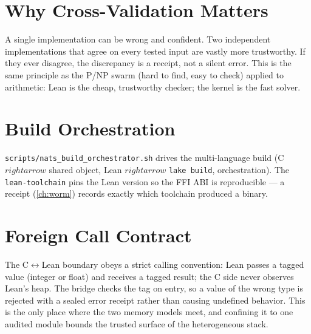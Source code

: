 \section{Why Cross-Validation Matters}
\label{sec:ffi-why}

A single implementation can be wrong and confident. Two independent
implementations that agree on every tested input are vastly more trustworthy.
If they ever disagree, the discrepancy is a receipt, not a silent error. This
is the same principle as the P/NP swarm (hard to find, easy to check)
applied to arithmetic: Lean is the cheap, trustworthy checker; the kernel is
the fast solver.

\section{Build Orchestration}
\label{sec:ffi-build}

\texttt{scripts/nats\_build\_orchestrator.sh} drives the multi-language build
(C $\ensuremath{rightarrow}$ shared object, Lean $\ensuremath{rightarrow}$ \texttt{lake build},
orchestration). The \texttt{lean-toolchain} pins the Lean version so the FFI
ABI is reproducible --- a receipt (\cref{ch:worm}) records exactly which
toolchain produced a binary.

\section{Foreign Call Contract}
\label{sec:ffi-contract}

The C$\leftrightarrow$Lean boundary obeys a strict calling convention:
Lean passes a tagged value (integer or float) and receives a tagged result;
the C side never observes Lean's heap. The bridge checks the tag on entry,
so a value of the wrong type is rejected with a sealed error receipt rather
than causing undefined behavior. This is the only place where the two
memory models meet, and confining it to one audited module bounds the
trusted surface of the heterogeneous stack.
